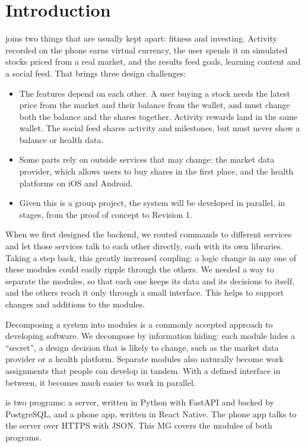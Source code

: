 \documentclass[12pt, titlepage]{article}
\begin{document}
\section{Introduction}

\progname{} joins two things that are usually kept apart: fitness and
investing. Activity recorded on the phone earns virtual currency, the user
spends it on simulated stocks priced from a real market, and the results feed
goals, learning content and a social feed. That brings three design
challenges:

\begin{itemize}
\item The features depend on each other. A user buying a stock needs the
  latest price from the market and their balance from the wallet, and must
  change both the balance and the shares together. Activity rewards land in
  the same wallet. The social feed shares activity and milestones, but must
  never show a balance or health data.
\item Some parts rely on outside services that may change: the market data
  provider, which allows users to buy shares in the first place, and the health
  platforms on iOS and Android.
\item Given this is a group project, the system will be developed in parallel,
  in stages, from the proof of concept to Revision 1.
\end{itemize}

When we first designed the backend, we routed commands to different services
and let those services talk to each other directly, each with its own
libraries. Taking a step back, this greatly increased coupling: a logic change
in any one of these modules could easily ripple through the others. We needed
a way to separate the modules, so that each one keeps its data and its
decisions to itself, and the others reach it only through a small interface.
This helps to support changes and additions to the modules.

Decomposing a system into modules is a commonly accepted approach to developing
software. We decompose \progname{} by information hiding: each module hides a
``secret'', a design decision that is likely to change, such as the market data
provider or a health platform. Separate modules also naturally become work
assignments that people can develop in tandem. With a defined interface in
between, it becomes much easier to work in parallel.

\progname{} is two programs: a server, written in Python with FastAPI and
backed by PostgreSQL, and a phone app, written in React Native. The phone app
talks to the server over HTTPS with JSON. This MG covers the modules of both
programs.
\end{document}
